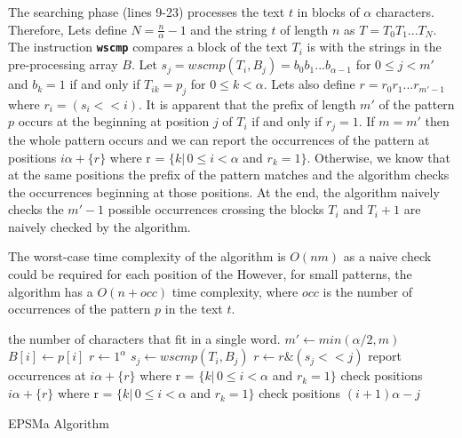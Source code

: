 The searching phase (lines 9-23) processes the text $t$ in blocks of $\alpha$ characters. Therefore, Lets define  $N = \frac{n}{\alpha} - 1$ and the string $t$ of length $n$ as $T=T_0 T_1...T_N$. The instruction \texttt{\textbf{wscmp}} compares a block of the text $T_i$ is with the strings in the pre-processing array $B$. Let $s_j = wscmp(T_i, B_j) = b_0 b_1 ...b_{\alpha-1}$ for $0 \leq j < m'$ and $b_k = 1$ if and only if $T_{ik} = p_j$ for $0 \leq k < \alpha$. Lets also define $r = r_0 r_1...r_{m'-1}$ where $r_i = (s_i << i)$. It is apparent that the prefix of length $m'$ of the pattern $p$
occurs at the beginning at position $j$ of $T_i$ if and only if $r_j = 1$. If $m = m'$ then the whole pattern occurs and we can report the occurrences of the pattern at positions $i\alpha + \{r\}$ where r = $\{k | \, 0 \leq i < \alpha$ and $r_k = 1\}$. Otherwise, we know that at the same positions the prefix of the pattern matches and the algorithm checks the occurrences beginning at those positions. At the end, the algorithm naively checks the $m' - 1$ possible occurrences crossing the blocks $T_i$ and $T_i+1$ are naively checked by the algorithm.

The worst-case time complexity of the algorithm is $O(nm)$ as a naive check could be required for each position of the  However, for small patterns, the algorithm has a $O(n+occ)$ time complexity, where $occ$ is the number of occurrences of the pattern $p$ in the text $t$.

\begin{algorithm}[H]
\begin{algorithmic}[1]
\State \alpha \gets the number of characters that fit in a single word. 
 
    \State $m' \gets min(\alpha/2, m)$
            \State $B[i] \gets p[i]$
       \EndFor
    \EndFor
        \State $r \gets 1^\alpha$
            \State $s_j \gets wscmp(T_i, B_j)$
            \State $r \gets r \& (s_j << j)$
        \EndFor
            \State report occurrences at $i\alpha + \{r\}$ where r = $\{k | \, 0 \leq i < \alpha$ and $r_k = 1\}$
        \Else
            \State check positions $i\alpha + \{r\}$ where r = $\{k | \, 0 \leq i < \alpha$ and $r_k = 1\}$
        \EndIf
            \State check positions $(i + 1)\alpha - j$
        \EndFor

    \EndFor

\EndFunction
\end{algorithmic}
\caption{EPSMa Algorithm}\label{alg:espma}
\end{algorithm}

